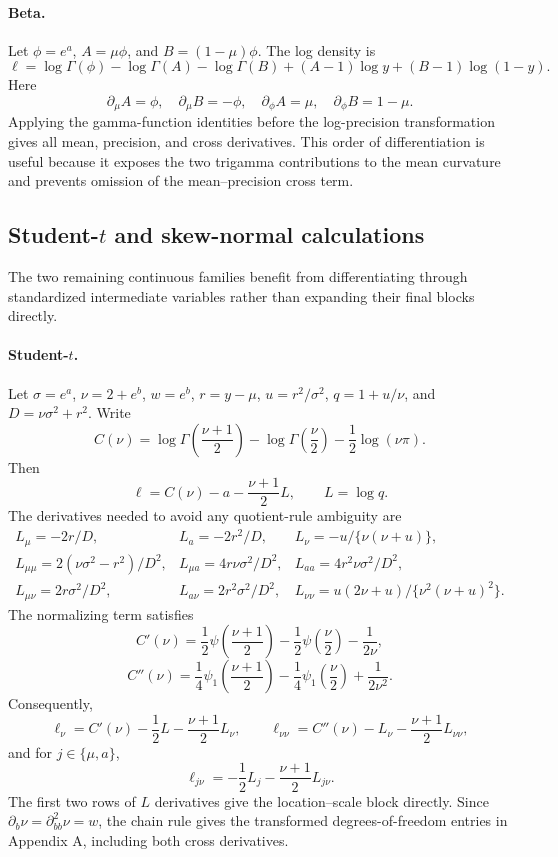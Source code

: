 \documentclass[a4paper,fleqn]{cas-sc}
\numberwithin{equation}{section}
\begin{document}
\paragraph{Beta.}
Let $\phi=e^a$, $A=\mu\phi$, and $B=(1-\mu)\phi$. The log density is
\[
 \ell=\log\Gamma(\phi)-\log\Gamma(A)-\log\Gamma(B)
 +(A-1)\log y+(B-1)\log(1-y).
\]
Here
\[
 \partial_\mu A=\phi,\quad \partial_\mu B=-\phi,\quad
 \partial_\phi A=\mu,\quad \partial_\phi B=1-\mu.
\]
Applying the gamma-function identities before the log-precision transformation gives all mean, precision, and cross derivatives. This order of differentiation is useful because it exposes the two trigamma contributions to the mean curvature and prevents omission of the mean--precision cross term.

\subsection{Student-\texorpdfstring{$t$}{t} and skew-normal calculations}

The two remaining continuous families benefit from differentiating through standardized intermediate variables rather than expanding their final blocks directly.

\paragraph{Student-$t$.}
Let $\sigma=e^a$, $\nu=2+e^b$, $w=e^b$, $r=y-\mu$,
$u=r^2/\sigma^2$, $q=1+u/\nu$, and $D=\nu\sigma^2+r^2$. Write
\[
 C(\nu)=\log\Gamma\!\left(\frac{\nu+1}{2}\right)
 -\log\Gamma\!\left(\frac{\nu}{2}\right)-\frac12\log(\nu\pi).
\]
Then
\[
 \ell=C(\nu)-a-\frac{\nu+1}{2}L,\qquad L=\log q.
\]
The derivatives needed to avoid any quotient-rule ambiguity are
\[
\begin{array}{lll}
 L_\mu=-2r/D,&
 L_a=-2r^2/D,&
 L_\nu=-u/\{\nu(\nu+u)\},\\[2pt]
 L_{\mu\mu}=2(\nu\sigma^2-r^2)/D^2,&
 L_{\mu a}=4r\nu\sigma^2/D^2,&
 L_{aa}=4r^2\nu\sigma^2/D^2,\\[2pt]
 L_{\mu\nu}=2r\sigma^2/D^2,&
 L_{a\nu}=2r^2\sigma^2/D^2,&
 L_{\nu\nu}=u(2\nu+u)/\{\nu^2(\nu+u)^2\}.
\end{array}
\]
The normalizing term satisfies
\[
 C'(\nu)=\frac12\psi\!\left(\frac{\nu+1}{2}\right)
 -\frac12\psi\!\left(\frac{\nu}{2}\right)-\frac{1}{2\nu},
\]
\[
 C''(\nu)=\frac14\psi_1\!\left(\frac{\nu+1}{2}\right)
 -\frac14\psi_1\!\left(\frac{\nu}{2}\right)+\frac{1}{2\nu^2}.
\]
Consequently,
\[
 \ell_\nu=C'(\nu)-\frac12L-\frac{\nu+1}{2}L_\nu,\qquad
 \ell_{\nu\nu}=C''(\nu)-L_\nu-\frac{\nu+1}{2}L_{\nu\nu},
\]
and for $j\in\{\mu,a\}$,
\[
 \ell_{j\nu}=-\frac12L_j-\frac{\nu+1}{2}L_{j\nu}.
\]
The first two rows of $L$ derivatives give the location--scale block directly. Since $\partial_b\nu=\partial_{bb}^2\nu=w$, the chain rule gives the transformed degrees-of-freedom entries in Appendix A, including both cross derivatives.
\end{document}
